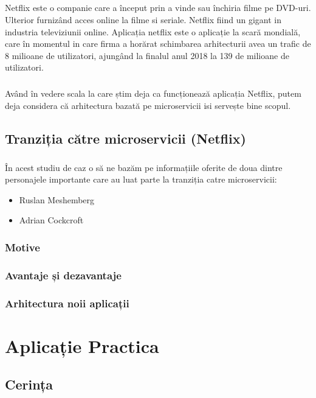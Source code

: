 \documentclass[12pt]{report}
\begin{document}
	\paragraph{}Netflix este o companie care a început prin a vinde sau închiria filme pe DVD-uri. Ulterior furnizând acces online la filme si seriale. Netflix fiind un gigant in industria televiziunii online. Aplicația netflix este o aplicație la scară mondială, care în momentul in care firma a horărat schimbarea arhitecturii avea un trafic de 8 milioane de utilizatori, ajungând la finalul anul 2018 la 139 de milioane de utilizatori.
	\paragraph{}Având în vedere scala la care știm deja ca funcționează aplicația Netflix, putem deja considera că arhitectura bazată pe microservicii isi servește bine scopul.
	\section{Tranziția către microservicii (Netflix)}
	\paragraph{}În acest studiu de caz o să ne bazăm pe informațiile oferite de doua dintre personajele importante care au luat parte la tranziția catre microservicii:
	\begin{itemize}
	\item Ruslan Meshemberg
	\item Adrian Cockcroft	
	\end{itemize}
	\subsection{Motive}
	\subsection{Avantaje și dezavantaje}
	\subsection{Arhitectura noii aplicații}
	
\chapter{Aplicație Practica}
	\section{Cerința}
\end{document}
